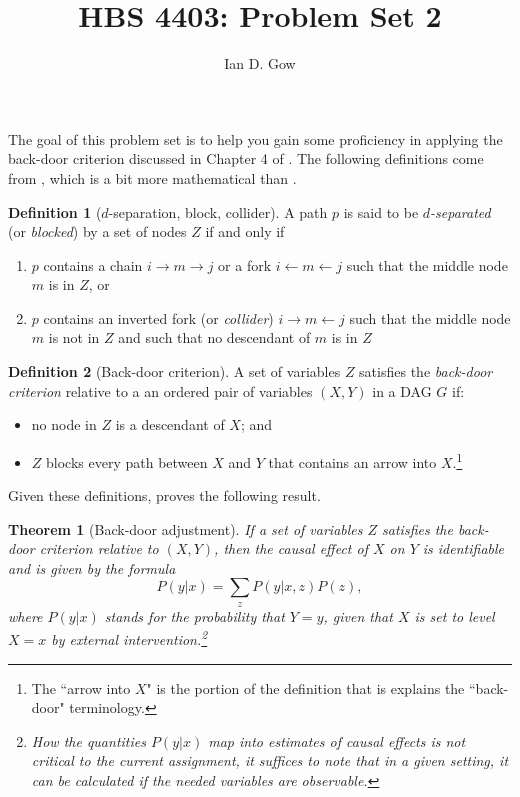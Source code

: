 \documentclass[11pt]{amsart}
\title[HBS 4403: Management Control and Performance Measurement]{HBS 4403: Problem Set 2}
\author{Ian D. Gow}
\newtheorem{theorem}{Theorem}
\theoremstyle{definition}
\newtheorem{definition}{Definition}
\theoremstyle{question}
\begin{document}
\usetikzlibrary{automata, shapes, calc, positioning}
\maketitle



The goal of this problem set is to help you gain some proficiency in applying the back-door criterion discussed in Chapter 4 of \citet{Morgan:2014vg}. 
The following definitions come from \citet{Pearl:2009vo}, which is a bit more mathematical than \citet{Morgan:2014vg}.

\begin{definition}[$d$-separation, block, collider]
A path $p$ is said to be \emph{$d$-separated} (or \emph{blocked}) by a set of nodes $Z$ if and only if
\begin{enumerate}
	\item $p$ contains a chain $i \rightarrow m \rightarrow j$ or a fork $i \leftarrow m \leftarrow j$ such that the middle node $m$ is in $Z$, or
	\item $p$ contains an inverted fork (or \emph{collider}) $i \rightarrow m \leftarrow j$ such that the middle node $m$ is not in $Z$ and such that no descendant of $m$ is in $Z$
\end{enumerate}
\end{definition}

\begin{definition}[Back-door criterion]
A set of variables $Z$ satisfies the \emph{back-door criterion} relative to a an ordered pair of variables $(X, Y)$ in a 
	DAG $G$ if:
	\begin{itemize}
		\item no node in $Z$ is a descendant of $X$; and
		\item $Z$ blocks every path between $X$ and $Y$ that contains an arrow into $X$.\footnote{The ``arrow into $X$" is the portion of the definition that is explains the ``back-door" terminology.}
	\end{itemize}
\end{definition}

Given these definitions, \citet[p.\,79]{Pearl:2009vo}
proves the following result.
\begin{theorem}[Back-door adjustment]
	If a set of variables $Z$ satisfies the back-door criterion relative to $(X, Y)$, then the causal effect of $X$ on $Y$ is identifiable and is given by the formula 
	\[ P(y | x) = \sum_{z} P(y | x, z) P(z), \]
where $P(y|x)$ stands for the probability that $Y = y$, given that $X$ is set to level $X=x$ by external intervention.\footnote{
How the quantities $P(y|x)$ map into estimates of causal effects is not critical to the current assignment, it suffices to note that in a given setting, it can be calculated if the needed variables are observable.}
\end{theorem}
\end{document}
